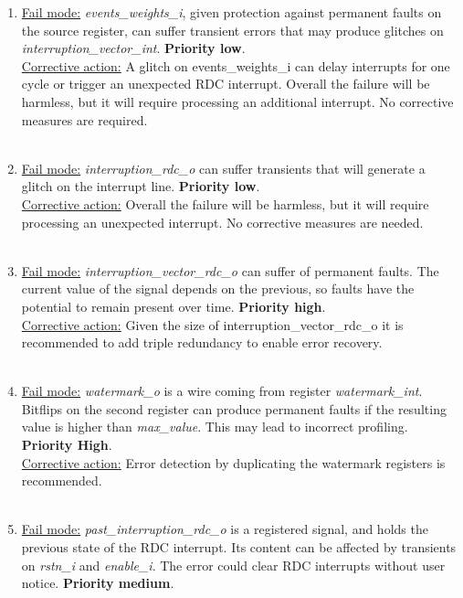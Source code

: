 \begin{enumerate}
\\
\item \underline{Fail mode:} \textit{events\_weights\_i}, given protection against permanent faults on the source register, can suffer transient errors that may produce glitches on \textit{interruption\_vector\_int}.\textbf{ Priority low}.\\
\underline{Corrective action:} A glitch on events\_weights\_i can delay interrupts for one cycle or trigger an unexpected RDC interrupt. Overall the failure will be harmless, but it will require processing an additional interrupt. No corrective measures are required. \\
\\
\item \underline{Fail mode:} \textit{interruption\_rdc\_o }can suffer transients that will generate a glitch on the interrupt line. \textbf{Priority low}.\\
\underline{Corrective action:} 
Overall the failure will be harmless, but it will require processing an unexpected interrupt. No corrective measures are needed. \\
\\
\item \underline{Fail mode:} \textit{interruption\_vector\_rdc\_o} can suffer of permanent faults. The current value of the signal depends on the previous, so faults have the potential to remain present over time. \textbf{Priority high}.\\
\underline{Corrective action:} Given the size of  interruption\_vector\_rdc\_o it is recommended to add triple redundancy to enable error recovery.\\
\\
\item \underline{Fail mode:} \textit{watermark\_o }is a wire coming from register\textit{ watermark\_int}. Bitflips on the second register can produce permanent faults if the resulting value is higher than \textit{max\_value}. This may lead to incorrect profiling. \textbf{Priority High}.\\
\underline{Corrective action:} Error detection by duplicating the watermark registers is recommended.\\
\\
\item \underline{Fail mode:} \textit{past\_interruption\_rdc\_o} is a registered signal, and holds the previous state of the RDC interrupt. Its content can be affected by transients on \textit{rstn\_i} and \textit{enable\_i}. The error could clear RDC interrupts without user notice. \textbf{Priority medium}.\\

\end{enumerate}
